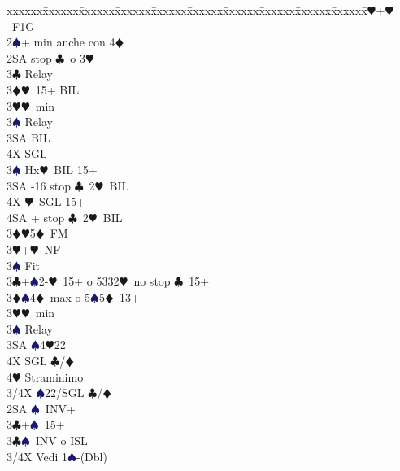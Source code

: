 \documentclass[a4paper,italian]{article}
\newcommand{\BC}{\textcolor{OliveGreen}{$\clubsuit$}}
\newcommand{\BD}{\textcolor{RedOrange}{$\vardiamondsuit$}}
\newcommand{\BH}{\textcolor{Red2}{$\varheartsuit${}}}
\newcommand{\BS}{\textcolor{MidnightBlue}{$\spadesuit${}}}
\newenvironment{bidtable}
{\begin{tabbing}

    xxxxxx\=xxxxxx\=xxxxxx\=xxxxxx\=xxxxxx\=xxxxxx\=xxxxxx\=xxxxxx\=xxxxxx\=xxxxxx\=\kill}
{\end{tabbing} }%
\begin{document}
\begin{multicols}{2}
\begin{bidtable}
        2\BH {}+\BH\ F1G\+\\
        2\BS {}+ min anche con 4\BD \\
        2SA  stop \BC\ o 3\BH \+\\
        3\BC \> Relay\+\\
        3\BD {}\BH\ 15+ BIL\\
        3\BH {}\BH\ min\+\\
        3\BS \> Relay\+\\
        3SA \> BIL\\
        4X \> SGL\-\-\\
        3\BS \> Hx\BH\ BIL 15+\\
        3SA -16 stop \BC\ 2\BH\ BIL\\
        4X \BH\ SGL 15+\\
        4SA + stop \BC\ 2\BH\ BIL\-\\
        3\BD {}\BH 5\BD\ FM\\
        3\BH {}+\BH\ NF\\
        3\BS \> Fit\-\\
        3\BC {}+\BS2-\BH\ 15+ o 5332\BH\ no stop \BC\ 15+\\
        3\BD {}\BS 4\BD\ max o 5\BS 5\BD\ 13+\\
        3\BH {}\BH\ min\+\\
        3\BS \> Relay\+\\
        3SA \BS 4\BH 22\\
        4X \> SGL \BC /\BD \\
        4\BH \> Straminimo\-\-\\
        3/4X \BS 22/SGL \BC /\BD \-\\
        2SA \BS\ INV+\+\\
        3\BC {}+\BS\ 15+\-\\
        3\BC{}\BS\ INV o ISL\\
        3/4X \> Vedi 1\BS -(Dbl)\-
    \end{bidtable}
\vfill\null


\end{multicols}
\end{document}
